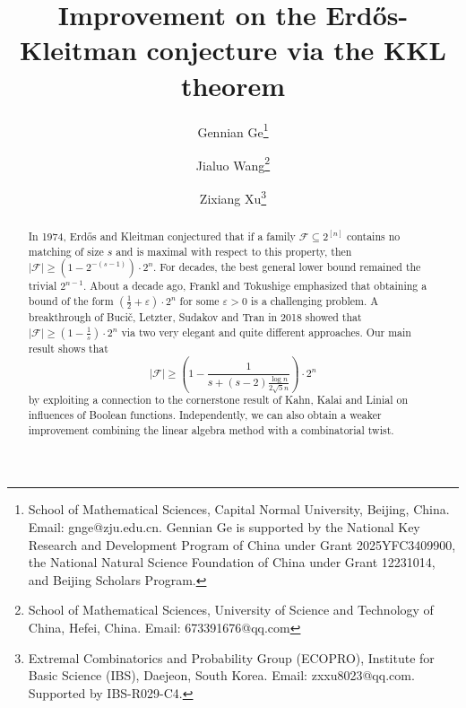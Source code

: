 \documentclass[11pt]{article}
\title{Improvement on the Erd\H{o}s-Kleitman conjecture via the KKL theorem}
\author{
Gennian Ge\thanks{School of Mathematical Sciences, Capital Normal University, Beijing, China. Email: gnge@zju.edu.cn. Gennian Ge is supported by the National Key Research and Development Program of China under Grant 2025YFC3409900, the National Natural Science Foundation of China under Grant 12231014, and Beijing Scholars Program.}
\and 
Jialuo Wang\thanks{School of Mathematical Sciences, University of Science and Technology of China,
Hefei, China. Email: 673391676@qq.com}
\and
Zixiang Xu\thanks{Extremal Combinatorics and Probability Group (ECOPRO), Institute for Basic Science (IBS), Daejeon, South Korea. Email: zxxu8023@qq.com. Supported by IBS-R029-C4.}
}
\date{}
\theoremstyle{definition}
\begin{document}
\maketitle
\begin{abstract}
In 1974, Erd\H{o}s and Kleitman conjectured that if a family \(\mathcal{F}\subseteq 2^{[n]}\) contains no matching of size \(s\) and is maximal with respect to this property, then
\(
|\mathcal{F}|\ge \left(1-2^{-(s-1)}\right)\cdot 2^{n}.
\)
For decades, the best general lower bound remained the trivial \(2^{n-1}\). About a decade ago, Frankl and Tokushige emphasized that obtaining a bound of the form \(\left(\frac{1}{2}+\varepsilon\right)\cdot 2^n\) for some \(\varepsilon>0\) is a challenging problem. A breakthrough of Buci\v{c}, Letzter, Sudakov and Tran in 2018 showed that
\(
|\mathcal{F}|\ge \left(1-\frac{1}{s}\right)\cdot 2^n
\)
via two very elegant and quite different approaches. Our main result shows that \[
|\mathcal{F}|\ge \left(
      1 - \frac{1}{s + (s-2)\frac{\log n}{2\sqrt{5}n}}
   \right)\cdot 2^n 
\] by exploiting a connection to the cornerstone result of Kahn, Kalai and Linial on influences of Boolean functions.
Independently, we can also obtain a weaker improvement combining the linear algebra method with a combinatorial twist.




\end{abstract}
\end{document}
